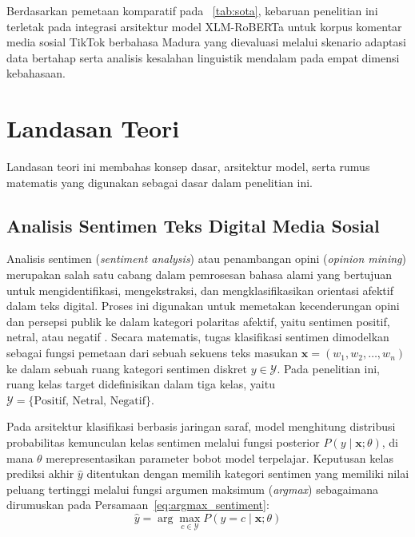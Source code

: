 Berdasarkan pemetaan komparatif pada \tablename~\ref{tab:sota}, kebaruan penelitian ini terletak pada integrasi arsitektur model XLM-RoBERTa untuk korpus komentar media sosial TikTok berbahasa Madura yang dievaluasi melalui skenario adaptasi data bertahap serta analisis kesalahan linguistik mendalam pada empat dimensi kebahasaan.

\section{Landasan Teori}

Landasan teori ini membahas konsep dasar, arsitektur model, serta rumus matematis yang digunakan sebagai dasar dalam penelitian ini.

\subsection{Analisis Sentimen Teks Digital Media Sosial}

Analisis sentimen (\textit{sentiment analysis}) atau penambangan opini (\textit{opinion mining}) merupakan salah satu cabang dalam pemrosesan bahasa alami yang bertujuan untuk mengidentifikasi, mengekstraksi, dan mengklasifikasikan orientasi afektif dalam teks digital. Proses ini digunakan untuk memetakan kecenderungan opini dan persepsi publik ke dalam kategori polaritas afektif, yaitu sentimen positif, netral, atau negatif \citep{aribowo2021cross, setiawan2023sentiment}. Secara matematis, tugas klasifikasi sentimen dimodelkan sebagai fungsi pemetaan dari sebuah sekuens teks masukan $\mathbf{x} = (w_1, w_2, \dots, w_n)$ ke dalam sebuah ruang kategori sentimen diskret $y \in \mathcal{Y}$. Pada penelitian ini, ruang kelas target didefinisikan dalam tiga kelas, yaitu $\mathcal{Y} = \{\text{Positif, Netral, Negatif}\}$.

Pada arsitektur klasifikasi berbasis jaringan saraf, model menghitung distribusi probabilitas kemunculan kelas sentimen melalui fungsi posterior $P(y \mid \mathbf{x}; \theta)$, di mana $\theta$ merepresentasikan parameter bobot model terpelajar. Keputusan kelas prediksi akhir $\hat{y}$ ditentukan dengan memilih kategori sentimen yang memiliki nilai peluang tertinggi melalui fungsi argumen maksimum (\textit{argmax}) sebagaimana dirumuskan pada Persamaan~\eqref{eq:argmax_sentiment}:
\begin{equation}
\label{eq:argmax_sentiment}
\hat{y} = \arg\max_{c \in \mathcal{Y}} P(y = c \mid \mathbf{x}; \theta)
\end{equation}

